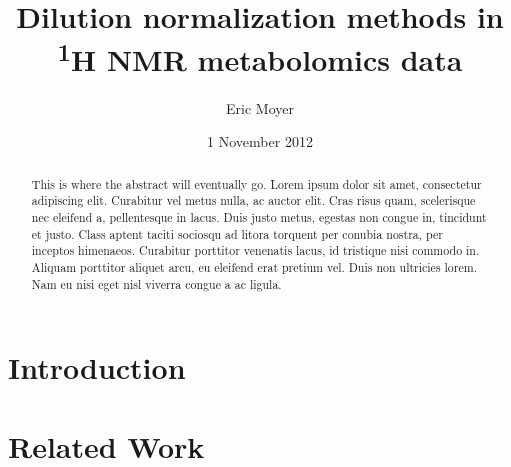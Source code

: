 \documentclass[english]{article}
\begin{document}
\title{Dilution normalization methods in \textsuperscript{1}H NMR metabolomics data}

\author{Eric Moyer}

\date{1 November 2012}

\maketitle

\begin{abstract}
This is where the abstract will eventually go. Lorem ipsum dolor sit amet, consectetur adipiscing elit. Curabitur vel metus nulla, ac auctor elit. Cras risus quam, scelerisque nec eleifend a, pellentesque in lacus. Duis justo metus, egestas non congue in, tincidunt et justo. Class aptent taciti sociosqu ad litora torquent per conubia nostra, per inceptos himenaeos. Curabitur porttitor venenatis lacus, id tristique nisi commodo in. Aliquam porttitor aliquet arcu, eu eleifend erat pretium vel. Duis non ultricies lorem. Nam eu nisi eget nisl viverra congue a ac ligula.
\end{abstract}

\section{Introduction}

\section{Related Work}
\end{document}
